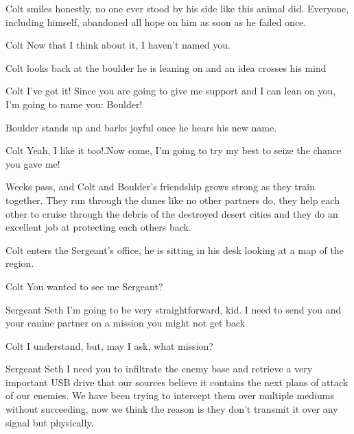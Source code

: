 \documentclass{screenplay}[2012/06/30]
\begin{document}
Colt smiles honestly, no one ever stood by his side like
this animal did. Everyone, including himself, abandoned all
hope on him as soon as he failed once.

\begin{dialogue}{Colt}
    Now that I think about it, I haven't named you.
\end{dialogue}

Colt looks back at the boulder he is leaning on and an
idea crosses his mind

\begin{dialogue}{Colt}
    I've got it! Since you are going to give me support
    and I can lean on you, I'm going to name you: Boulder!
\end{dialogue}

Boulder stands up and barks joyful once he hears his new name.

\begin{dialogue}{Colt}
    Yeah, I like it too!.Now come, I'm going to try my best
    to seize the chance you gave me!
\end{dialogue}

Weeks pass, and Colt and Boulder's friendship grows strong
as they train together. They run through the dunes like no
other partners do, they help each other to cruise through the
debris of the destroyed desert cities and they do an excellent
job at protecting each others back.

Colt enters the Sergeant's office, he is sitting in his desk
looking at a map of the region.

\begin{dialogue}{Colt}
    You wanted to see me Sergeant?
\end{dialogue}

\begin{dialogue}{Sergeant Seth}
    I'm going to be very straightforward, kid. I need to
    send you and your canine partner on a mission you might
    not get back
\end{dialogue}

\begin{dialogue}{Colt}
    I understand, but, may I ask, what mission?
\end{dialogue}

\begin{dialogue}{Sergeant Seth}
    I need you to infiltrate the enemy base and retrieve 
    a very important USB drive that our sources believe 
    it contains the next plans of attack of our enemies.
    We have been trying to intercept them over multiple 
    mediums without succeeding, now we think the reason is 
    they don't transmit it over any signal but physically.
\end{dialogue}
\end{document}

